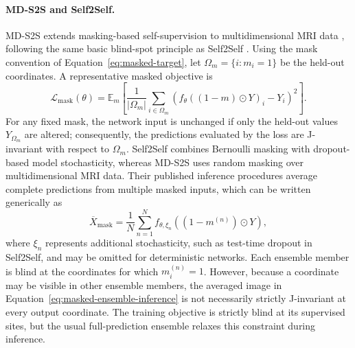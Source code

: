 \documentclass[preprint,12pt]{elsarticle}
\begin{document}
\paragraph{MD-S2S and Self2Self.}
MD-S2S extends masking-based self-supervision to multidimensional MRI data \cite{kang2024mds2s}, following the same basic blind-spot principle as Self2Self \cite{self2self}. Using the mask convention of Equation~\eqref{eq:masked-target}, let $\Omega_m=\{i:m_i=1\}$ be the held-out coordinates. A representative masked objective is
\begin{equation}
  \mathcal{L}_{\mathrm{mask}}(\theta)
  =
  \mathbb{E}_{m}\!\left[
    \frac{1}{|\Omega_m|}
    \sum_{i\in\Omega_m}
    \left(
      f_\theta\!\left((1-m)\odot Y\right)_i-Y_i
    \right)^2
  \right].
  \label{eq:masked-self-supervised-loss}
\end{equation}
For any fixed mask, the network input is unchanged if only the held-out values $Y_{\Omega_m}$ are altered; consequently, the predictions evaluated by the loss are J-invariant with respect to $\Omega_m$. Self2Self combines Bernoulli masking with dropout-based model stochasticity, whereas MD-S2S uses random masking over multidimensional MRI data. Their published inference procedures average complete predictions from multiple masked inputs, which can be written generically as
\begin{equation}
  \overline{X}_{\mathrm{mask}}
  =
  \frac{1}{N}
  \sum_{n=1}^{N}
  f_{\theta,\xi_n}\!\left((1-m^{(n)})\odot Y\right),
  \label{eq:masked-ensemble-inference}
\end{equation}
where $\xi_n$ represents additional stochasticity, such as test-time dropout in Self2Self, and may be omitted for deterministic networks. Each ensemble member is blind at the coordinates for which $m_i^{(n)}=1$. However, because a coordinate may be visible in other ensemble members, the averaged image in Equation~\eqref{eq:masked-ensemble-inference} is not necessarily strictly J-invariant at every output coordinate. The training objective is strictly blind at its supervised sites, but the usual full-prediction ensemble relaxes this constraint during inference.
\end{document}
